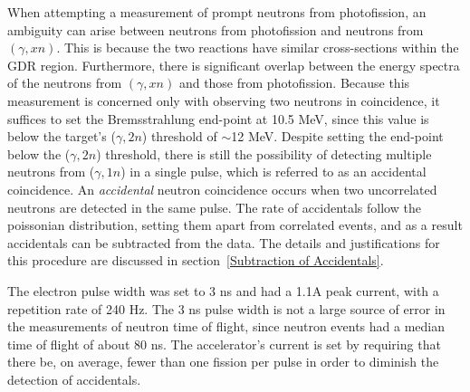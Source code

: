 When attempting a measurement of prompt neutrons from photofission, an ambiguity can arise between neutrons from photofission and neutrons from $(\gamma, xn)$.
This is because the two reactions have similar cross-sections within the GDR region.
Furthermore, there is significant overlap between the energy spectra of the neutrons from $(\gamma, xn)$ and those from photofission.
Because this measurement is concerned only with observing two neutrons in coincidence, it suffices to set the Bremsstrahlung end-point at 10.5 MeV, since this value is below the target's ($\gamma, 2n$) threshold of $\sim$12 MeV.
Despite setting the end-point below the ($\gamma, 2n$) threshold, there is still the possibility of detecting multiple neutrons from ($\gamma, 1n$) in a single pulse, which is referred to as an accidental coincidence.
An \textit{accidental} neutron coincidence occurs when two uncorrelated neutrons are detected in the same pulse.
The rate of accidentals follow the poissonian distribution, setting them apart from correlated events, and as a result accidentals can be subtracted from the data.
The details and justifications for this procedure are discussed in section~\ref{Subtraction of Accidentals}.

The electron pulse width was set to 3 ns and had a 1.1A peak current, with a repetition rate of 240 Hz.
The 3 ns pulse width is not a large source of error in the measurements of neutron time of flight, since neutron events had a median time of flight of about 80 ns.
The accelerator's current is set by requiring that there be, on average, fewer than one fission per pulse in order to diminish the detection of accidentals.

